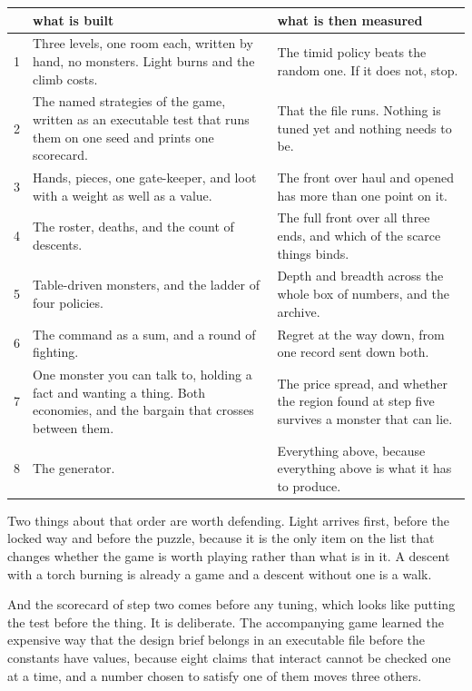 \documentclass[11pt,a4paper]{article}
\begin{document}
\begin{center}
\begin{tabular}{@{}l@{\hspace{4mm}}>{\raggedright\arraybackslash}p{}@{\hspace{4mm}}>{\raggedright\arraybackslash}p{}@{}}
\toprule
& \textbf{what is built} & \textbf{what is then measured} \\
\midrule
1 & Three levels, one room each, written by hand, no monsters. Light burns and the climb costs. &
The timid policy beats the random one. If it does not, stop. \\[1mm]
2 & The named strategies of the game, written as an executable test that runs them on one seed
and prints one scorecard. &
That the file runs. Nothing is tuned yet and nothing needs to be. \\[1mm]
3 & Hands, pieces, one gate-keeper, and loot with a weight as well as a value. &
The front over haul and opened has more than one point on it. \\[1mm]
4 & The roster, deaths, and the count of descents. &
The full front over all three ends, and which of the scarce things binds. \\[1mm]
5 & Table-driven monsters, and the ladder of four policies. &
Depth and breadth across the whole box of numbers, and the archive. \\[1mm]
6 & The command as a sum, and a round of fighting. &
Regret at the way down, from one record sent down both. \\[1mm]
7 & One monster you can talk to, holding a fact and wanting a thing. Both economies, and the
bargain that crosses between them. &
The price spread, and whether the region found at step five survives a monster that can lie. \\[1mm]
8 & The generator. &
Everything above, because everything above is what it has to produce. \\
\bottomrule
\end{tabular}
\end{center}

Two things about that order are worth defending. Light arrives first, before the locked way and
before the puzzle, because it is the only item on the list that changes whether the game is worth
playing rather than what is in it. A descent with a torch burning is already a game and a descent
without one is a walk.

\begin{sectionbox}
And the scorecard of step two comes before any tuning, which looks like putting the test before
the thing. It is deliberate. The accompanying game learned the expensive way that the design brief
belongs in an executable file before the constants have values, because eight claims that
interact cannot be checked one at a time, and a number chosen to satisfy one of them moves three
others.
\end{sectionbox}
\end{document}
